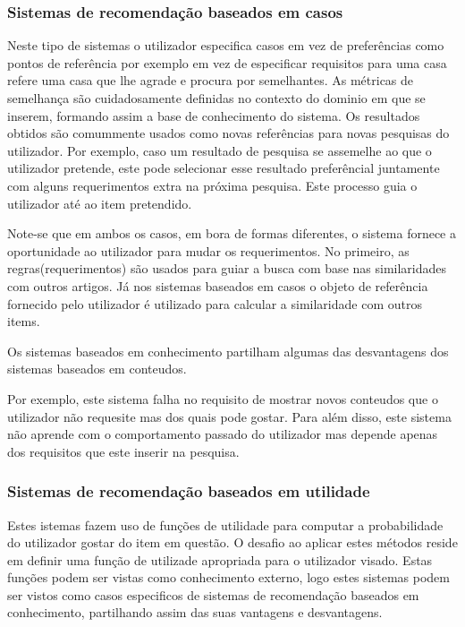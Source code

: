 \subsubsection{Sistemas de recomendação baseados em casos}
\hfill
\par Neste tipo de sistemas o utilizador especifica casos  em vez de preferências como pontos de referência por exemplo em vez de especificar requisitos para uma casa refere uma casa que lhe agrade e procura por semelhantes. As métricas de semelhança são cuidadosamente definidas no contexto do dominio em que se inserem, formando assim a base de conhecimento do sistema. Os resultados obtidos são comummente usados como novas referências para novas pesquisas do utilizador.  Por exemplo, caso um resultado de pesquisa se assemelhe ao que o utilizador pretende, este pode selecionar esse resultado preferêncial juntamente com alguns requerimentos extra na próxima pesquisa. Este processo guia o utilizador até ao item pretendido.
\par Note-se que em ambos os casos, em bora de formas diferentes, o sistema fornece a oportunidade ao utilizador para mudar os requerimentos.
No primeiro, as regras(requerimentos) são usados para guiar a busca com base nas similaridades com outros artigos. Já nos sistemas baseados em casos o objeto de referência fornecido pelo utilizador é utilizado para calcular a similaridade com outros items.
\par Os sistemas baseados em conhecimento partilham algumas das desvantagens dos sistemas baseados em conteudos. 
\par Por exemplo, este sistema falha no requisito de mostrar novos conteudos que o utilizador não requesite mas dos quais pode gostar.
Para além disso, este sistema não aprende com o comportamento passado do utilizador mas depende apenas dos requisitos que este inserir na pesquisa.

\hfill
\subsubsection{Sistemas de recomendação baseados em utilidade}
\hfill
\par Estes istemas fazem uso de funções de utilidade para computar a probabilidade do utilizador gostar do item em questão. O desafio ao aplicar estes métodos reside em definir uma função de utilizade apropriada para o utilizador visado. Estas funções podem ser vistas como conhecimento externo, logo estes sistemas podem ser vistos como casos especificos de sistemas de recomendação baseados em conhecimento, partilhando assim das suas vantagens e desvantagens.

